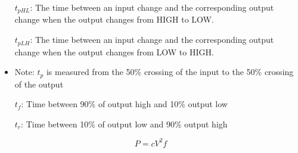 \documentclass[8pt]{article}
\begin{document}
\begin{itemize}
    \item[$t_{pHL}$:] The time between an input change and the corresponding output change
          when the output changes from HIGH to LOW.
    \item[$t_{pLH}$:] The time between an input change and the corresponding output change
          when the output changes from LOW to HIGH.
    \item Note: $t_p$ is measured from the 50\% crossing
          of the input to the 50\% crossing of the output
    \item[$t_f$:] Time between 90\% of output high and 10\% output low
    \item[$t_r$:] Time between 10\% of output low and 90\% output high
\end{itemize}

\[  P = cV^2 f \]
\end{document}
